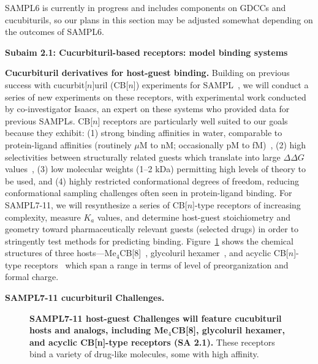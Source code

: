 \documentclass[11pt]{article}
\begin{document}
SAMPL6 is currently in progress and includes components on GDCCs and cucubiturils, so our plans in this section may be adjusted somewhat depending on the outcomes of SAMPL6.

\textbf{Subaim 2.1: Cucurbituril-based receptors: model binding systems}

\textbf{Cucurbituril derivatives for host-guest binding.} 
Building on previous success with cucurbit[$n$]uril (CB[$n$]) experiments for SAMPL~\cite{ma_acyclic_2012-2, cao_absolute_2014, she_glycoluril-derived_2016}, we will conduct a series of new experiments on these receptors,
with experimental work conducted by co-investigator Isaacs, an expert on these systems who provided data for previous SAMPLs.
CB[$n$] receptors are particularly well suited to our goals because they exhibit: (1) strong binding affinities in water, comparable to protein-ligand affinities (routinely $\mu$M to nM; occasionally pM to fM)~\cite{cao_attomolar_2014, liu_cucurbituril_2005, mock_structure_1986, assaf_cucurbiturils:_2015, moghaddam_new_2011, shetty_can_2015, biedermann_release_2012}, (2) high selectivities between structurally related guests which translate into large $\Delta \Delta G$ values~\cite{isaacs_stimuli_2014}, (3) low molecular weights (1--2 kDa) permitting high levels of theory to be used, and (4) highly restricted conformational degrees of freedom, reducing conformational sampling challenges often seen in protein-ligand binding.
For SAMPL7-11, we will resynthesize a series of CB[$n$]-type receptors of increasing complexity, measure $K_a$ values, and determine host-guest stoichiometry and geometry toward pharmaceutically relevant guests (selected drugs) in order to stringently test methods for predicting binding.  
Figure~\ref{figure:CB} shows the chemical structures of three hosts---Me$_4$CB[8]~\cite{vinciguerra_synthesis_2015}, glycoluril hexamer~\cite{lucas_templated_2011}, and acyclic CB[$n$]-type receptors~\cite{ma_acyclic_2012, ma_acyclic_2012-1, zhang_acyclic_2014, gilberg_acyclic_2015, sigwalt_acyclic_2016, zhang_acyclic_2014-1} which span a range in terms of level of preorganization and formal charge.

\eject 

\textbf{SAMPL7-11 cucurbituril Challenges.} 


\begin{figure}[h]
\vspace{-0.1in}
\begin{centering}

\end{centering}

\caption{
\label{figure:CB} \footnotesize {\bf SAMPL7-11 host-guest Challenges will feature cucubituril hosts and analogs, including Me$_4$CB[8], glycoluril hexamer, and acyclic CB[n]-type receptors (SA 2.1).} 
These receptors bind a variety of drug-like molecules, some with high affinity.
\vspace{-0.15in}
}
\end{figure}
\end{document}
